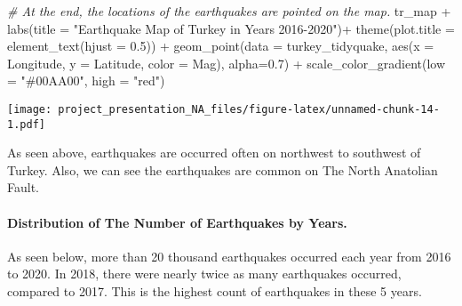 \documentclass[
]{article}
\newenvironment{Shaded}{\begin{snugshade}}{\end{snugshade}}
\newcommand{\AttributeTok}[1]{\textcolor[rgb]{0.77,0.63,0.00}{#1}}
\newcommand{\CommentTok}[1]{\textcolor[rgb]{0.56,0.35,0.01}{\textit{#1}}}
\newcommand{\FloatTok}[1]{\textcolor[rgb]{0.00,0.00,0.81}{#1}}
\newcommand{\FunctionTok}[1]{\textcolor[rgb]{0.00,0.00,0.00}{#1}}
\newcommand{\NormalTok}[1]{#1}
\newcommand{\SpecialCharTok}[1]{\textcolor[rgb]{0.00,0.00,0.00}{#1}}
\newcommand{\StringTok}[1]{\textcolor[rgb]{0.31,0.60,0.02}{#1}}
\begin{document}
\begin{Shaded}
\begin{Highlighting}[]
\CommentTok{\# At the end, the locations of the earthquakes are pointed on the map.}
\NormalTok{tr\_map }\SpecialCharTok{+}
  \FunctionTok{labs}\NormalTok{(}\AttributeTok{title =} \StringTok{"Earthquake Map of Turkey in Years 2016{-}2020"}\NormalTok{)}\SpecialCharTok{+}
  \FunctionTok{theme}\NormalTok{(}\AttributeTok{plot.title =} \FunctionTok{element\_text}\NormalTok{(}\AttributeTok{hjust =} \FloatTok{0.5}\NormalTok{)) }\SpecialCharTok{+}
  \FunctionTok{geom\_point}\NormalTok{(}\AttributeTok{data =}\NormalTok{ turkey\_tidyquake, }\FunctionTok{aes}\NormalTok{(}\AttributeTok{x =}\NormalTok{ Longitude, }\AttributeTok{y =}\NormalTok{ Latitude, }\AttributeTok{color =}\NormalTok{ Mag), }\AttributeTok{alpha=}\FloatTok{0.7}\NormalTok{) }\SpecialCharTok{+}
  \FunctionTok{scale\_color\_gradient}\NormalTok{(}\AttributeTok{low =} \StringTok{"\#00AA00"}\NormalTok{, }\AttributeTok{high =} \StringTok{"red"}\NormalTok{)}
\end{Highlighting}
\end{Shaded}

\texttt{[image: project\_presentation\_NA\_files/figure-latex/unnamed-chunk-14-1.pdf]}

As seen above, earthquakes are occurred often on northwest to southwest
of Turkey. Also, we can see the earthquakes are common on The North
Anatolian Fault.

\hypertarget{distribution-of-the-number-of-earthquakes-by-years.}{%
\paragraph{Distribution of The Number of Earthquakes by
Years.}\label{distribution-of-the-number-of-earthquakes-by-years.}}

As seen below, more than 20 thousand earthquakes occurred each year from
2016 to 2020. In 2018, there were nearly twice as many earthquakes
occurred, compared to 2017. This is the highest count of earthquakes in
these 5 years.
\end{document}
